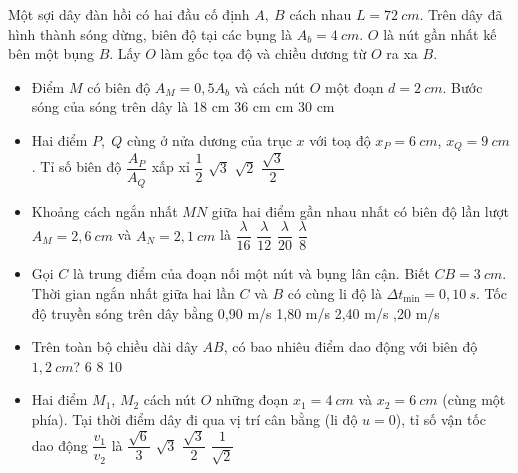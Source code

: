 \begin{vidu}
Một sợi dây đàn hồi có hai đầu cố định $A,\ B$ cách nhau $L = 72\ cm$. Trên dây đã hình thành sóng dừng, biên độ tại các bụng là $A_b = 4\ cm$. $O$ là nút gần nhất kế bên một bụng $B$. Lấy $O$ làm gốc tọa độ và chiều dương từ $O$ ra xa $B$.
\begin{itemize}
\item[1.] Điểm $M$ có biên độ $A_M = 0,5A_b$ và cách nút $O$ một đoạn $d = 2\ cm$.  
Bước sóng của sóng trên dây là
\choice
{18 cm}
{36 cm}
{ cm}
{30 cm}	
\item[2.] Hai điểm $P,\;Q$ cùng ở nửa dương của trục $x$ với toạ độ $x_P = 6\ cm$, $x_Q = 9\ cm$. Tỉ số biên độ $\dfrac{A_P}{A_Q}$ xấp xỉ
\choice
{$\dfrac12$}
{$\sqrt{3}$}
{\True $\sqrt{2}$}
{$\dfrac{\sqrt{3}}{2}$}
\item[3.] Khoảng cách ngắn nhất $MN$ giữa hai điểm gần nhau nhất có biên độ lần lượt  
$A_M = 2,6\ cm$ và $A_N = 2,1\ cm$ là
\choice
{$\dfrac{\lambda}{16}$}
{$\dfrac{\lambda}{12}$}
{\True $\dfrac{\lambda}{20}$}
{$\dfrac{\lambda}{8}$}
\item[4.] Gọi $C$ là trung điểm của đoạn nối một nút và bụng lân cận. Biết $CB = 3\ cm$. Thời gian ngắn nhất giữa hai lần $C$ và $B$ có cùng li độ là $\Delta t_{\min}=0,10\ s$.  
Tốc độ truyền sóng trên dây bằng
\choice
{0,90 m/s}
{1,80 m/s}
{2,40 m/s}
{,20 m/s}
\item[5.] Trên toàn bộ chiều dài dây $AB$, có bao nhiêu điểm dao động với biên độ $1,2\ cm$?
\choice
{6}
{8}
{10}
{}
\item[6.] Hai điểm $M_1,\,M_2$ cách nút $O$ những đoạn $x_1 = 4\ cm$ và $x_2 = 6\ cm$ (cùng một phía).  
Tại thời điểm dây đi qua vị trí cân bằng (li độ $u=0$), tỉ số vận tốc dao động $\dfrac{v_1}{v_2}$ là
\choice
{$\dfrac{\sqrt{6}}{3}$}
{$\sqrt{3}$}
{\True $\dfrac{\sqrt{3}}{2}$}
{$\dfrac{1}{\sqrt{2}}$}
\end{itemize}
\end{vidu}
